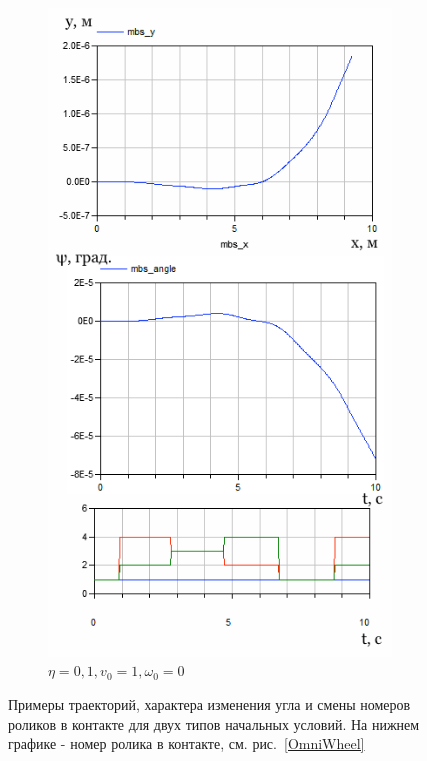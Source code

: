 \begin{figure}[h]
\begin{subfigure}{.47\textwidth}
\end{subfigure}%
\hspace{5pt}
\begin{subfigure}{.47\textwidth}
    \centering
    \includegraphics[width=\textwidth]{content/parts/3_friction/diploma/img/res/example_v_1_0_omega_0_frac_1e-1_n_4_time_10s.png}
    \caption{$\eta = 0,1, v_0 = 1, \omega_0 = 0$}
    \label{fig:exp_example_v}
\end{subfigure}
\caption{Примеры траекторий, характера изменения угла и смены номеров роликов в контакте для двух типов начальных условий. На нижнем графике - номер ролика в контакте, см. рис.~\ref{OmniWheel}}
\label{fig:exp_examples}
\end{figure}
\newpage


